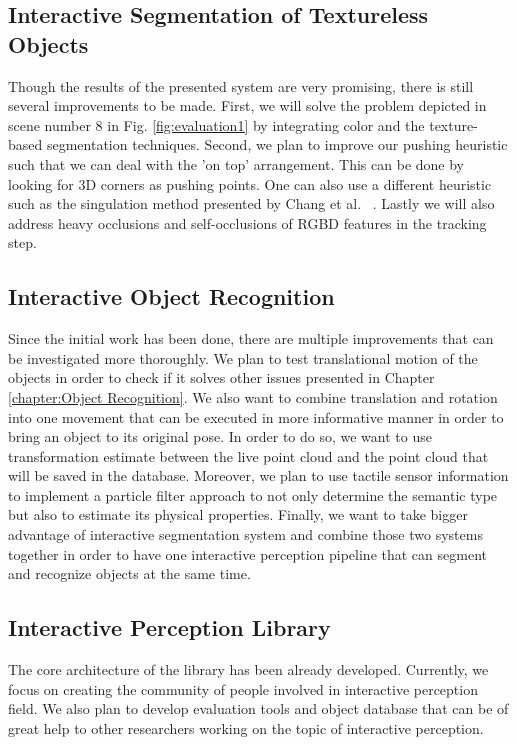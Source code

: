 \subsection{Interactive Segmentation of Textureless Objects}
Though the results of the presented system are very promising, there is still several improvements to be made. First, we
will solve the problem depicted in scene number 8 in Fig. \ref{fig:evaluation1} by integrating color and the texture-based segmentation techniques.
Second, we plan to improve our pushing heuristic such that we
can deal with the ’on top’ arrangement. This can be done by
looking for 3D corners as pushing points. One can also use a
different heuristic such as the singulation method presented by
Chang et al. ~\cite{chang11interactive}. Lastly we will also address heavy occlusions
and self-occlusions of RGBD features in the tracking step.


\subsection{Interactive Object Recognition}
Since the initial work has been done, there are multiple improvements that can be investigated more thoroughly. We plan to test translational motion of the objects in order to check if it solves other issues presented in Chapter \ref{chapter:Object Recognition}. We also want to combine translation and rotation into one movement that can be executed in more informative manner in order to bring an object to its original pose. In order to do so, we want to use transformation estimate between the live point cloud and the point cloud that will be saved in the database. Moreover, we plan to use tactile sensor information to implement a particle filter approach to not only determine the semantic type but also to estimate its physical properties. Finally, we want to take bigger advantage of interactive segmentation system and combine those two systems together in order to have one interactive perception pipeline that can segment and recognize objects at the same time. 


\subsection{Interactive Perception Library}
The core architecture of the library has been already developed. Currently, we focus on creating the community of people involved in interactive perception field. We also plan to develop evaluation tools and object database that can be of great help to other researchers working on the topic of interactive perception.